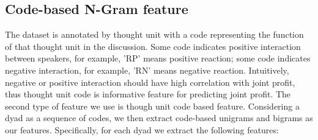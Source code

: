 \documentclass[11pt]{article} %
\begin{document}
\subsection{Code-based N-Gram feature}
The dataset is annotated by thought unit with a code representing the function of that thought unit in the discussion.  Some code indicates positive interaction between speakers, for example, 'RP' means positive reaction; some code indicates negative interaction, for example, 'RN' means negative reaction. Intuitively, negative or positive interaction should have high correlation with joint profit, thus thought unit code is informative feature for predicting joint profit. The second type of feature we use is though unit code based feature. Considering a dyad as a sequence of codes, we then extract code-based unigrams and bigrams as our features. Specifically, for each dyad we extract the following features:
\end{document}
